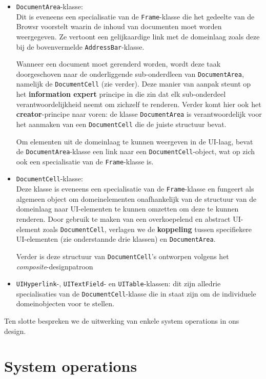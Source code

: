 \documentclass[12pt]{article}
\begin{document}
\begin{itemize}
	 \item \texttt{DocumentArea}-klasse:\\
	 Dit is eveneens een specialisatie van de \texttt{Frame}-klasse die het gedeelte van de Browsr voorstelt waarin de inhoud van documenten moet worden weergegeven. Ze vertoont een gelijkaardige link met de domeinlaag zoals deze bij de bovenvermelde \texttt{AddressBar}-klasse. 
	 
	 Wanneer een document moet gerenderd worden, wordt deze taak doorgeschoven naar de onderliggende sub-onderdleen van \texttt{DocumentArea}, namelijk de \texttt{DocumentCell} (zie verder). Deze manier van aanpak steunt op het \textbf{information expert} principe in die zin dat elk sub-onderdeel verantwoordelijkheid neemt om zichzelf te renderen. Verder komt hier ook het \textbf{creator}-principe naar voren: de klasse \texttt{DocumentArea} is verantwoordelijk voor het aanmaken van een \texttt{DocumentCell} die de juiste structuur bevat.
	 
	 Om elementen uit de domeinlaag te kunnen weergeven in de UI-laag, bevat de \texttt{DocumentArea}-klasse een link naar een \texttt{DocumentCell}-object, wat op zich ook een specialisatie van de \texttt{Frame}-klasse is.
	 
	 \item \texttt{DocumentCell}-klasse:\\
	 Deze klasse is eveneens een specialisatie van de \texttt{Frame}-klasse en fungeert als algemeen object om domeinelementen onafhankelijk van de structuur van de domeinlaag naar UI-elementen te kunnen omzetten om deze te kunnen renderen. Door gebruik te maken van een overkoepelend en abstract UI-element zoals \texttt{DocumentCell}, verlagen we de \textbf{koppeling} tussen specifiekere UI-elementen (zie onderstannde drie klassen) en \texttt{DocumentArea}.
	 
	 Verder is deze structuur van \texttt{DocumentCell}'s ontworpen volgens het \textit{composite}-designpatroon
	 
	 \item \texttt{UIHyperlink}-, \texttt{UITextField}- en \texttt{UITable}-klassen:
	 dit zijn alledrie specialisaties van de \texttt{DocumentCell}-klasse die in staat zijn om de individuele domeinobjecten voor te stellen. 
 \end{itemize}

Ten slotte bespreken we de uitwerking van enkele system operations in ons design.

\section{System operations}
\end{document}
